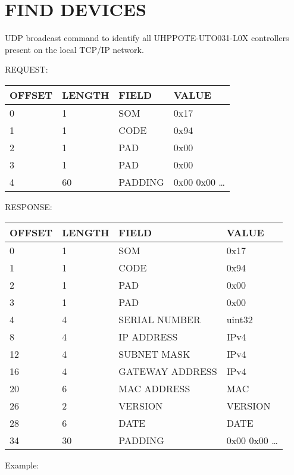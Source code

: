 \documentclass[11pt, oneside]{article}
\begin{document}

\section*{FIND DEVICES}

UDP broadcast command to identify all UHPPOTE-UTO031-L0X controllers present on the local TCP/IP network.

REQUEST:

{ \begin{tabular}{ | l | l | l | l | }
   \hline
   OFFSET & LENGTH & FIELD & VALUE \\ 
   \hline
   0 & 1 & SOM & 0x17 \\ 
   \hline
   1 & 1 & CODE & 0x94 \\ 
   \hline
   2 & 1 & PAD & 0x00 \\ 
   \hline
   3 & 1 & PAD & 0x00 \\ 
   \hline
   4 & 60 & PADDING & 0x00 0x00 \ldots \\ 
   \hline
   \end{tabular}
   \vspace{0.5cm}
}

RESPONSE:

{ \begin{tabular}{ | l | l | l | l | }
   \hline
   OFFSET & LENGTH & FIELD & VALUE \\ 
   \hline
   0 & 1 & SOM & 0x17 \\ 
   \hline
   1 & 1 & CODE & 0x94 \\ 
   \hline
   2 & 1 & PAD & 0x00 \\ 
   \hline
   3 & 1 & PAD & 0x00 \\ 
   \hline
   4 & 4 & SERIAL NUMBER & uint32 \\ 
   \hline
   8 & 4 & IP ADDRESS & IPv4 \\ 
   \hline
   12 & 4 & SUBNET MASK & IPv4 \\ 
   \hline
   16 & 4 & GATEWAY ADDRESS & IPv4 \\ 
   \hline
   20 & 6 & MAC ADDRESS & MAC \\ 
   \hline
   26 & 2 & VERSION & VERSION \\ 
   \hline
   28 & 6 & DATE & DATE \\ 
   \hline
   34 & 30 & PADDING & 0x00 0x00 \ldots \\ 
   \hline
   \end{tabular}
   \vspace{0.5cm}
}

Example:
\end{document}
